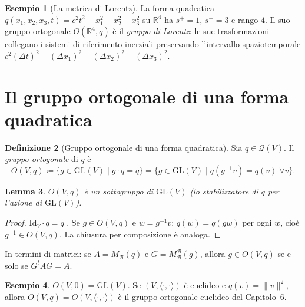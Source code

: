 \documentclass[11pt, a4paper]{book}
\theoremstyle{definition}
\newtheorem{definizione}{Definizione}[section]
\newtheorem{esempio}[definizione]{Esempio}
\theoremstyle{plain}
\newtheorem{lemma}[definizione]{Lemma}
\theoremstyle{remark}
\newcommand{\R}{\mathbb{R}}
\newcommand{\Id}{\mathrm{Id}}
\newcommand{\GL}{\mathrm{GL}}
\begin{document}
\begin{exbox}
\begin{esempio}[La metrica di Lorentz]
La forma quadratica $q(x_1,x_2,x_3,t) = c^2t^2 - x_1^2 - x_2^2 - x_3^2$ su $\R^4$ ha $s^+ = 1$, $s^- = 3$ e rango $4$. Il suo gruppo ortogonale $O(\R^4,q)$ è il \emph{gruppo di Lorentz}: le sue trasformazioni collegano i sistemi di riferimento inerziali preservando l'intervallo spaziotemporale $c^2(\Delta t)^2 - (\Delta x_1)^2 - (\Delta x_2)^2 - (\Delta x_3)^2$.
\end{esempio}
\end{exbox}

\section{Il gruppo ortogonale di una forma quadratica}
\label{sec:gruppo-ortogonale-qf}

\begin{defbox}
\begin{definizione}[Gruppo ortogonale di una forma quadratica]
\label{def:gruppo-ort-qf}
Sia $q \in \mathcal{Q}(V)$. Il \emph{gruppo ortogonale} di $q$ è
\[
  O(V,q) \coloneqq \{ g \in \GL(V) \mid g \cdot q = q \} = \{ g \in \GL(V) \mid q(g^{-1}v) = q(v)\;\forall v \}.
\]
\end{definizione}
\end{defbox}

\begin{lemma}
$O(V,q)$ è un sottogruppo di $\GL(V)$ (lo stabilizzatore di $q$ per l'azione di $\GL(V)$).
\end{lemma}

\begin{proof}
$\Id_V \cdot q = q$ \checkmark. Se $g \in O(V,q)$ e $w = g^{-1}v$: $q(w) = q(gw)$ per ogni $w$, cioè $g^{-1} \in O(V,q)$. La chiusura per composizione è analoga.
\end{proof}

In termini di matrici: se $A = M_\mathcal{B}(q)$ e $G = M^\mathcal{B}_\mathcal{B}(g)$, allora $g \in O(V,q)$ se e solo se $G^t A G = A$.

\begin{exbox}
\begin{esempio}
$O(V,0) = \GL(V)$. Se $(V,\langle\cdot,\cdot\rangle)$ è euclideo e $q(v) = \|v\|^2$, allora $O(V,q) = O(V,\langle\cdot,\cdot\rangle)$ è il gruppo ortogonale euclideo del Capitolo~6.
\end{esempio}
\end{exbox}
\end{document}
